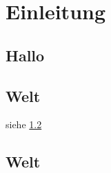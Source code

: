 \chapter{Einleitung}\label{cha:Einleitung}
\section{Hallo}\label{sec:hallo}

\blindtext[20]


\section{Welt}\label{sec:hallo}


siehe \ref{sec:hallo}


\blindtext[20]


\section{Welt}

\blindtext[20]
